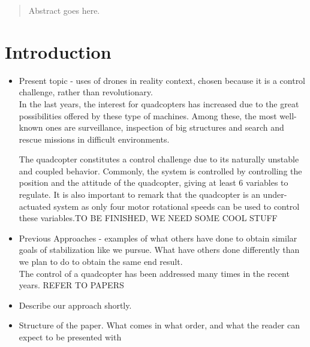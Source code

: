 \maketitle

\begin{abstract}
Abstract goes here.
\end{abstract}



%
\IEEEpeerreviewmaketitle


\section{Introduction}
\begin{itemize}
\item Present topic - uses of drones in reality context, chosen because it is a control challenge, rather than revolutionary.\\
In the last years, the interest for quadcopters has increased due to the great possibilities offered by these type of machines. Among these, the most well-known ones are surveillance, inspection of big structures and search and rescue missions in difficult environments.

The quadcopter constitutes a control challenge due to its naturally unstable and coupled behavior. Commonly, the system is controlled by controlling the position and the attitude of the quadcopter, giving at least 6 variables to regulate. It is also important to remark that the quadcopter is an under-actuated system as only four motor rotational speeds can be used to control these variables.TO BE FINISHED, WE NEED SOME COOL STUFF
\item Previous Approaches - examples of what others have done to obtain similar goals of stabilization like we pursue. What have others done differently than we plan to do to obtain the same end result. \\ 
The control of a quadcopter has been addressed many times in the recent years. REFER TO PAPERS
\item Describe our approach shortly.\\
\item Structure of the paper. What comes in what order, and what the reader can expect to be presented with
\end{itemize}


